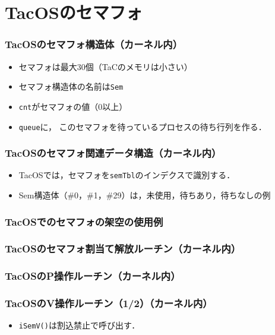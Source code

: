 \documentclass{beamer}                   %
\begin{document}
\section{TacOSのセマフォ}
\begin{frame}
  \frametitle{TacOSのセマフォ構造体（カーネル内）}
  \begin{itemize}
    \item セマフォは最大30個（TaCのメモリは小さい）
    \item セマフォ構造体の名前は{\tt Sem}
    \item {\tt cnt}がセマフォの値（0以上）
    \item {\tt queue}に，
      このセマフォを待っているプロセスの待ち行列を作る．
  \end{itemize}
\end{frame}

\begin{frame}
  \frametitle{TacOSのセマフォ関連データ構造（カーネル内）}
  \begin{itemize}
    \item TacOSでは，セマフォを{\tt semTbl}のインデクスで識別する．
    \item Sem構造体（\#0，\#1，\#29）は，未使用，待ちあり，待ちなしの例
  \end{itemize}
\end{frame}

\begin{frame}
  \frametitle{TacOSでのセマフォの架空の使用例}
\end{frame}

\begin{frame}
  \frametitle{TacOSのセマフォ割当て解放ルーチン（カーネル内）}
\end{frame}

\begin{frame}
  \frametitle{TacOSのP操作ルーチン（カーネル内）}
\end{frame}

\begin{frame}
  \frametitle{TacOSのV操作ルーチン（1/2）（カーネル内）}
  \begin{itemize}
  \item {\tt iSemV()}は割込禁止で呼び出す．
  \end{itemize}
\end{frame}
\end{document}
